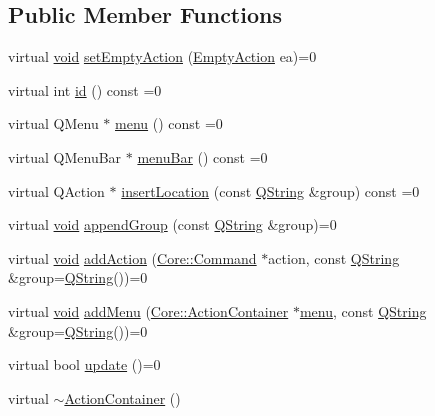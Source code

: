 \subsection*{\-Public \-Member \-Functions}
\begin{DoxyCompactItemize}
\item 
virtual \hyperlink{group___u_a_v_objects_plugin_ga444cf2ff3f0ecbe028adce838d373f5c}{void} \hyperlink{group___core_plugin_gae80d85ff590923f92540ca6a4b35694e}{set\-Empty\-Action} (\hyperlink{group___core_plugin_ga25957afb898f645827d8e7949c831327}{\-Empty\-Action} ea)=0
\item 
virtual int \hyperlink{group___core_plugin_gae3760030de490ae638ec35547d79d5da}{id} () const =0
\item 
virtual \-Q\-Menu $\ast$ \hyperlink{group___core_plugin_ga8e92377ca31ccb08155053b639c13059}{menu} () const =0
\item 
virtual \-Q\-Menu\-Bar $\ast$ \hyperlink{group___core_plugin_gaf02adf2900f7a064f59f14a8af0fe547}{menu\-Bar} () const =0
\item 
virtual \-Q\-Action $\ast$ \hyperlink{group___core_plugin_ga9429467e6adc07c5d348224bbc65ac54}{insert\-Location} (const \hyperlink{group___u_a_v_objects_plugin_gab9d252f49c333c94a72f97ce3105a32d}{\-Q\-String} \&group) const =0
\item 
virtual \hyperlink{group___u_a_v_objects_plugin_ga444cf2ff3f0ecbe028adce838d373f5c}{void} \hyperlink{group___core_plugin_ga6479409008a106faa25ceccc055c0bd6}{append\-Group} (const \hyperlink{group___u_a_v_objects_plugin_gab9d252f49c333c94a72f97ce3105a32d}{\-Q\-String} \&group)=0
\item 
virtual \hyperlink{group___u_a_v_objects_plugin_ga444cf2ff3f0ecbe028adce838d373f5c}{void} \hyperlink{group___core_plugin_gaae18910476f06c6af0eecd572bf1dd51}{add\-Action} (\hyperlink{class_core_1_1_command}{\-Core\-::\-Command} $\ast$action, const \hyperlink{group___u_a_v_objects_plugin_gab9d252f49c333c94a72f97ce3105a32d}{\-Q\-String} \&group=\hyperlink{group___u_a_v_objects_plugin_gab9d252f49c333c94a72f97ce3105a32d}{\-Q\-String}())=0
\item 
virtual \hyperlink{group___u_a_v_objects_plugin_ga444cf2ff3f0ecbe028adce838d373f5c}{void} \hyperlink{group___core_plugin_ga77e35e602ffea9dac9cf53ccd0f582a8}{add\-Menu} (\hyperlink{class_core_1_1_action_container}{\-Core\-::\-Action\-Container} $\ast$\hyperlink{group___core_plugin_ga8e92377ca31ccb08155053b639c13059}{menu}, const \hyperlink{group___u_a_v_objects_plugin_gab9d252f49c333c94a72f97ce3105a32d}{\-Q\-String} \&group=\hyperlink{group___u_a_v_objects_plugin_gab9d252f49c333c94a72f97ce3105a32d}{\-Q\-String}())=0
\item 
virtual bool \hyperlink{group___core_plugin_ga04932c7a13be19e6c83354411964d848}{update} ()=0
\item 
virtual \hyperlink{group___core_plugin_gadce9ee76d4dad19beb7d474531bb7579}{$\sim$\-Action\-Container} ()
\end{DoxyCompactItemize}


